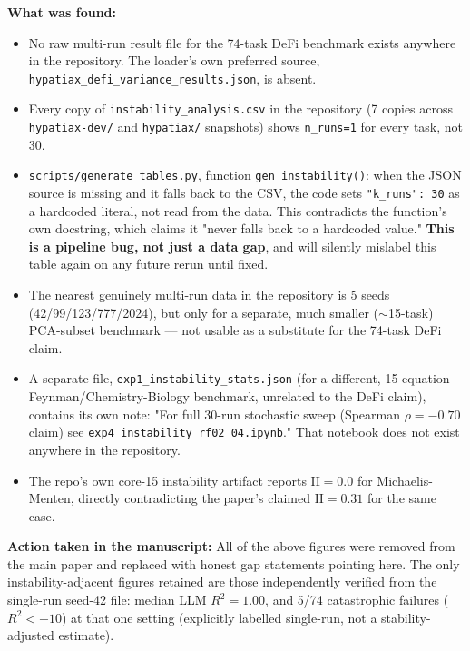 \documentclass[11pt]{article}
\newcommand{\Rsq}{R^{2}}
\newcommand{\II}{\mathrm{II}}
\begin{document}
\textbf{What was found:}
\begin{itemize}
  \item No raw multi-run result file for the 74-task DeFi benchmark exists
    anywhere in the repository. The loader's own preferred source,
    \texttt{hypatiax\_defi\_variance\_results.json}, is absent.
  \item Every copy of \texttt{instability\_analysis.csv} in the repository
    (7 copies across \texttt{hypatiax-dev/} and \texttt{hypatiax/} snapshots)
    shows \texttt{n\_runs=1} for every task, not 30.
  \item \texttt{scripts/generate\_tables.py}, function \texttt{gen\_instability()}: when
    the JSON source is missing and it falls back to the CSV, the code sets
    \texttt{"k\_runs": 30} as a hardcoded literal, not read from the data.
    This contradicts the function's own docstring, which claims it "never
    falls back to a hardcoded value." \textbf{This is a pipeline bug, not
    just a data gap}, and will silently mislabel this table again on any
    future rerun until fixed.
  \item The nearest genuinely multi-run data in the repository is 5 seeds
    (42/99/123/777/2024), but only for a separate, much smaller ($\sim$15-task)
    PCA-subset benchmark — not usable as a substitute for the 74-task DeFi
    claim.
  \item A separate file, \texttt{exp1\_instability\_stats.json} (for a
    different, 15-equation Feynman/Chemistry-Biology benchmark, unrelated to
    the DeFi claim), contains its own note: "For full 30-run stochastic
    sweep (Spearman $\rho=-0.70$ claim) see
    \texttt{exp4\_instability\_rf02\_04.ipynb}." That notebook does not
    exist anywhere in the repository.
  \item The repo's own core-15 instability artifact reports
    $\II=0.0$ for Michaelis-Menten, directly contradicting the paper's
    claimed $\II=0.31$ for the same case.
\end{itemize}

\textbf{Action taken in the manuscript:} All of the above figures were
removed from the main paper and replaced with honest gap statements
pointing here. The only instability-adjacent figures retained are those
independently verified from the single-run seed-42 file: median LLM
$\Rsq=1.00$, and 5/74 catastrophic failures ($\Rsq<-10$) at that one setting
(explicitly labelled single-run, not a stability-adjusted estimate).
\end{document}
